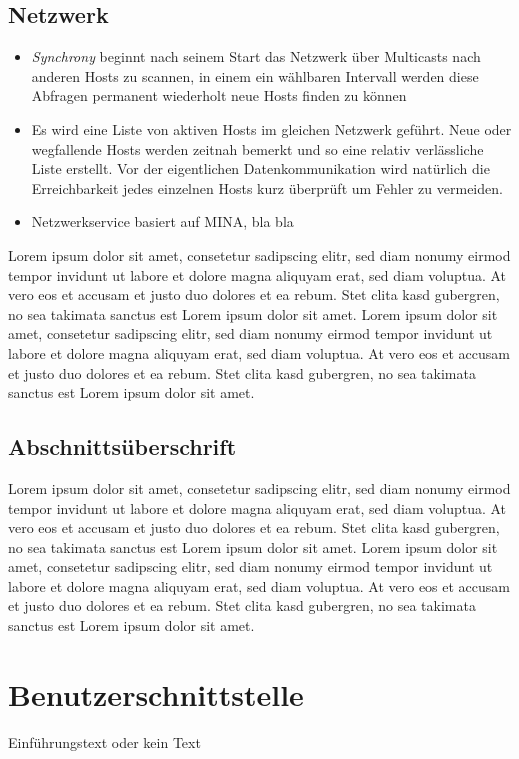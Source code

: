 \documentclass[12pt,oneside,a4paper,bibtotoc,liststotoc,pointlessnumbers]{scrartcl}
\begin{document}
\subsection{Netzwerk}
\begin{itemize}
\item \textit{Synchrony} beginnt nach seinem Start das Netzwerk über Multicasts nach anderen Hosts zu scannen, in einem ein wählbaren Intervall werden diese Abfragen permanent wiederholt neue Hosts finden zu können
\item Es wird eine Liste von aktiven Hosts im gleichen Netzwerk geführt. Neue oder wegfallende Hosts werden zeitnah bemerkt und so eine relativ verlässliche Liste erstellt. Vor der eigentlichen Datenkommunikation wird natürlich die Erreichbarkeit jedes einzelnen Hosts kurz überprüft um Fehler zu vermeiden.
\item Netzwerkservice basiert auf MINA, bla bla
\end{itemize}
\vspace{12px}
Lorem ipsum dolor sit amet, consetetur sadipscing elitr, sed diam nonumy eirmod tempor invidunt ut labore et dolore magna aliquyam erat, sed diam voluptua. At vero eos et accusam et justo duo dolores et ea rebum. Stet clita kasd gubergren, no sea takimata sanctus est Lorem ipsum dolor sit amet. Lorem ipsum dolor sit amet, consetetur sadipscing elitr, sed diam nonumy eirmod tempor invidunt ut labore et dolore magna aliquyam erat, sed diam voluptua. At vero eos et accusam et justo duo dolores et ea rebum. Stet clita kasd gubergren, no sea takimata sanctus est Lorem ipsum dolor sit amet.
\subsection{Abschnittsüberschrift}
Lorem ipsum dolor sit amet, consetetur sadipscing elitr, sed diam nonumy eirmod tempor invidunt ut labore et dolore magna aliquyam erat, sed diam voluptua. At vero eos et accusam et justo duo dolores et ea rebum. Stet clita kasd gubergren, no sea takimata sanctus est Lorem ipsum dolor sit amet. Lorem ipsum dolor sit amet, consetetur sadipscing elitr, sed diam nonumy eirmod tempor invidunt ut labore et dolore magna aliquyam erat, sed diam voluptua. At vero eos et accusam et justo duo dolores et ea rebum. Stet clita kasd gubergren, no sea takimata sanctus est Lorem ipsum dolor sit amet.

\newpage
\section{Benutzerschnittstelle}
Einführungstext oder kein Text
\end{document}
